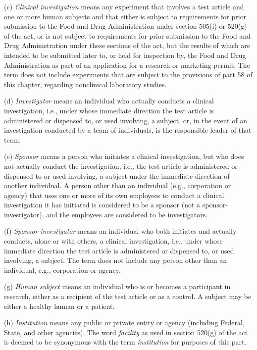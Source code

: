 \documentclass[11pt]{article}
\begin{document}
(c) \textit{Clinical investigation} means any experiment that involves a test article and one or more human subjects and that either is subject to requirements for prior submission to the Food and Drug Administration under section 505(i) or 520(g) of the act, or is not subject to requirements for prior submission to the Food and Drug Administration under these sections of the act, but the results of which are intended to be submitted later to, or held for inspection by, the Food and Drug Administration as part of an application for a research or marketing permit. The term does not include experiments that are subject to the provisions of part 58 of this chapter, regarding nonclinical laboratory studies.

(d) \textit{Investigator} means an individual who actually conducts a clinical investigation, i.e., under whose immediate direction the test article is administered or dispensed to, or used involving, a subject, or, in the event of an investigation conducted by a team of individuals, is the responsible leader of that team.

(e) \textit{Sponsor} means a person who initiates a clinical investigation, but who does not actually conduct the investigation, i.e., the test article is administered or dispensed to or used involving, a subject under the immediate direction of another individual. A person other than an individual (e.g., corporation or agency) that uses one or more of its own employees to conduct a clinical investigation it has initiated is considered to be a sponsor (not a sponsor-investigator), and the employees are considered to be investigators.

(f) \textit{Sponsor-investigator} means an individual who both initiates and actually conducts, alone or with others, a clinical investigation, i.e., under whose immediate direction the test article is administered or dispensed to, or used involving, a subject. The term does not include any person other than an individual, e.g., corporation or agency.

(g) \textit{Human subject} means an individual who is or becomes a participant in research, either as a recipient of the test article or as a control. A subject may be either a healthy human or a patient.

(h) \textit{Institution} means any public or private entity or agency (including Federal, State, and other agencies). The word \textit{facility} as used in section 520(g) of the act is deemed to be synonymous with the term \textit{institution} for purposes of this part.
\end{document}

